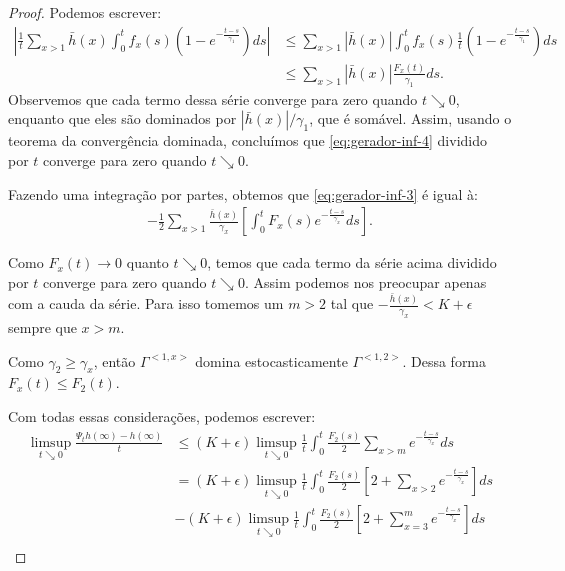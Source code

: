 \begin{proof}
  Podemos escrever:
  \begin{align*}
    \left| \frac{1}{t} \sum_{x > 1} \bar{h}(x) \int_0^t f_x (s) \left(
        1 - e^{-\frac{t-s}{\gamma_1}}
      \right) d s \right| &\leq
  \sum_{x > 1} |\bar{h}(x)| \int_0^t f_x (s) \frac{1}{t}\left(
    1 - e^{-\frac{t-s}{\gamma_1}}
  \right) d s \\
  & \leq \sum_{x > 1} |\bar{h}(x)| \frac{F_x(t)}{\gamma_1} d s  .
  \end{align*}
  Observemos que cada termo dessa série converge para zero quando $t
  \searrow 0$, enquanto que eles são dominados por $|\bar{h}(x)| /
  \gamma_1$, que é somável. Assim, usando o teorema da convergência
  dominada, concluímos que \eqref{eq:gerador-inf-4} dividido por
  $t$ converge para zero quando $t \searrow 0$.

  Fazendo uma integração por partes, obtemos que
  \eqref{eq:gerador-inf-3} é igual à:
  \begin{align*}
    - \frac{1}{2} \sum_{x > 1} \frac{\bar{h}(x)}{\gamma_x} \left[
      \int_0^t F_x (s) e^{-\frac{t-s}{\gamma_x}} ds
    \right].
  \end{align*}

  Como $F_x(t) \to 0$ quanto $t \searrow 0$, temos que cada termo da
  série acima dividido por $t$ converge para zero quando $t \searrow
  0$. Assim podemos nos preocupar apenas com a cauda da série. Para
  isso tomemos um $m > 2$ tal que $-\frac{\bar{h}(x)}{\gamma_x} < K +
  \epsilon$ sempre que $x > m$.

  Como $\gamma_2\geq \gamma_x$, então $\Gamma^{<1, x>}$ domina
  estocasticamente $\Gamma^{<1, 2>}$. Dessa forma $F_x(t) \leq
  F_2(t)$.

  Com todas essas considerações, podemos escrever:
  \begin{align*}
    \limsup_{t \searrow 0} \frac{\Psi_t h(\infty) - h(\infty)}{t}
    &\leq \left( K + \epsilon \right) \limsup_{t \searrow
      0}\frac{1}{t} \int_0^t \frac{F_2(s)}{2} \sum_{x >
      m}e^{-\frac{t-s}{\gamma_x}} ds\\
    &= \left( K + \epsilon \right) \limsup_{t \searrow
      0}\frac{1}{t} \int_0^t \frac{F_2(s)}{2} \left[
      2 + \sum_{x > 2} e^{-\frac{t-s}{\gamma_x}}
    \right] ds\\
    &- \left( K + \epsilon \right) \limsup_{t \searrow
      0}\frac{1}{t} \int_0^t \frac{F_2(s)}{2} \left[
      2 + \sum_{x=3}^m e^{-\frac{t-s}{\gamma_x}}
    \right] ds\\
  \end{align*}


\end{proof}
